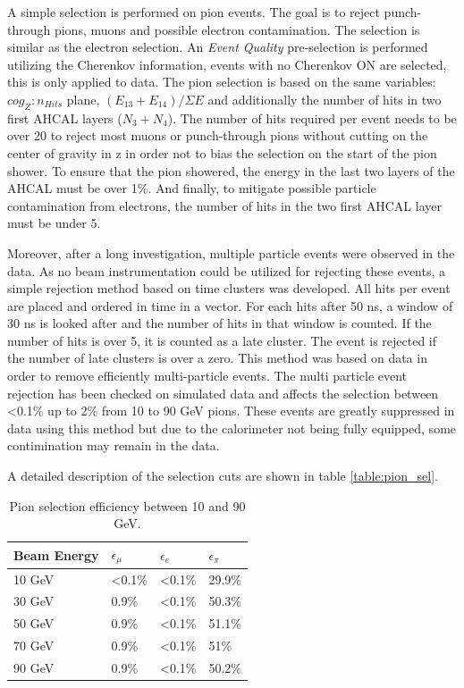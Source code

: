 A simple selection is performed on pion events. The goal is to reject punch-through pions, muons and possible electron contamination. The selection is similar as the electron selection. An \textit{Event Quality} pre-selection is performed utilizing the Cherenkov information, events with no Cherenkov ON are selected, this is only applied to data. The pion selection is based on the same variables: $cog_Z:n_{Hits}$ plane, $(E_{13}+E_{14})/\Sigma E$ and additionally the number of hits in two first AHCAL layers ($N_3+N_4$). The number of hits required per event needs to be over 20 to reject most muons or punch-through pions without cutting on the center of gravity in z in order not to bias the selection on the start of the pion shower. To ensure that the pion showered, the energy in the last two layers of the AHCAL must be over 1\%. And finally, to mitigate possible particle contamination from electrons, the number of hits in the two first AHCAL layer must be under 5.

Moreover, after a long investigation, multiple particle events were observed in the data. As no beam instrumentation could be utilized for rejecting these events, a simple rejection method based on time clusters was developed. All hits per event are placed and ordered in time in a vector. For each hits after 50 ns, a window of 30 ns is looked after and the number of hits in that window is counted. If the number of hits is over 5, it is counted as a late cluster. The event is rejected if the number of late clusters is over a zero. This method was based on data in order to remove efficiently multi-particle events. The multi particle event rejection has been checked on simulated data and affects the selection between <0.1\% up to 2\% from 10 to 90 GeV pions.
These events are greatly suppressed in data using this method but due to the calorimeter not being fully equipped, some contimination may remain in the data.

A detailed description of the selection cuts are shown in table \ref{table:pion_sel}.

\begin{table}[htb!]
	\centering
	\caption{Pion selection efficiency between 10 and 90 GeV.}
	\label{table:eff_electron}
	\begin{tabular}{@{} llll @{}}
		\hline
		\textbf{Beam Energy} & \textbf{$\epsilon_{\mu}$} & \textbf{$\epsilon_{e}$} & \textbf{$\epsilon_{\pi}$}\\
		\hline
		10 GeV & <0.1\% & <0.1\% & 29.9\%\\
		30 GeV & 0.9\% & <0.1\% & 50.3\%\\
		50 GeV & 0.9\% & <0.1\% & 51.1\%\\
		70 GeV & 0.9\% & <0.1\% & 51\%\\
		90 GeV & 0.9\% & <0.1\% & 50.2\%\\
		\hline
	\end{tabular}
\end{table}

